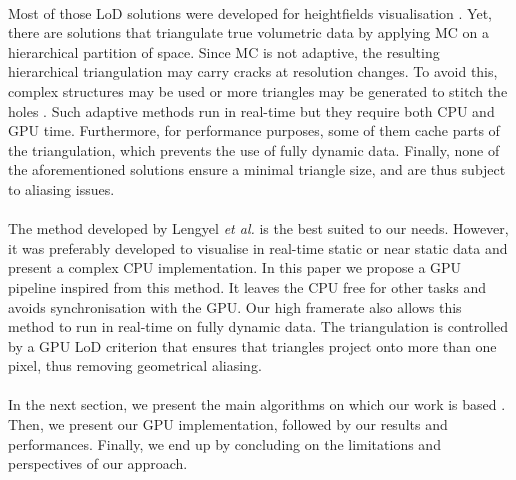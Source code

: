 \paragraph{}
Most of those LoD solutions were developed for heightfields visualisation \cite{duchaineau1997roaming}.
Yet, there are solutions that triangulate true volumetric data by applying MC on a hierarchical partition of space.
Since MC is not adaptive, the resulting hierarchical triangulation may carry cracks at resolution changes.
To avoid this, complex structures \cite{scholz2014real,schaefer2004dual} may be used or more triangles may be generated to stitch the holes \cite{lengyel2010voxel}.
Such adaptive methods run in real-time but they require both CPU and GPU time.
Furthermore, for performance purposes, some of them cache parts of the triangulation, which prevents the use of fully dynamic data.
Finally, none of the aforementioned solutions ensure a minimal triangle size, and are thus subject to aliasing issues.

\paragraph{} %
The method developed by Lengyel \textit{et al.} \cite{lengyel2010voxel} is the best suited to our needs.
However, it was preferably developed to visualise in real-time static or near static data and present a complex CPU implementation.
In this paper we propose a GPU pipeline inspired from this method.
It leaves the CPU free for other tasks and avoids synchronisation with the GPU.
Our high framerate also allows this method to run in real-time on fully dynamic data. 
The triangulation is controlled by a GPU LoD criterion that ensures that triangles project onto more than one pixel, thus removing geometrical aliasing.

\paragraph{}
In the next section, we present the main algorithms on which our work is based \cite{lengyel2010voxel,dupuy2014quadtrees}. 
Then, we present our GPU implementation, followed by our results and performances.
Finally, we end up by concluding on the limitations and perspectives of our approach.
